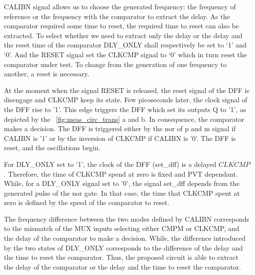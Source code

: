 CALIBN signal allows us to choose the generated frequency: the frequency of reference or the frequency with the comparator to extract the delay. As the comparator required some time to reset, the required time to reset can also be extracted. To select whether we need to extract only the delay or the delay and the reset time of the comparator DLY\_ONLY shall respectively be set to `1' and `0'. And the RESET signal set the CLKCMP signal to `0' which in turn reset the comparator under test. To change from the generation of one frequency to another, a reset is necessary.

At the moment when the signal RESET is released, the reset signal of the DFF is disengage and CLKCMP keep its state. Few picoseconds later, the clock signal of the DFF rise to '1'. This edge triggers the DFF which set its outputs Q to '1', as depicted by the \figurename~\ref{fig:meas_circ_trans} a and b. In consequence, the comparator makes a decision. The DFF is triggered either by the nor of p and m signal if CALIBN is '1' or by the inversion of CLKCMP if CALIBN is '0'. The DFF is reset, and the oscillations begin.

For DLY\_ONLY set to '1', the clock of the DFF (set\_dff) is a delayed \(\overline{CLKCMP}\). Therefore, the time of CLKCMP spend at zero is fixed and PVT dependant. While, for a DLY\_ONLY signal set to '0', the signal set\_dff depends from the generated pulse of the nor gate. In that case, the time that CLKCMP spent at zero is defined by the speed of the comparator to reset.

The frequency difference between the two modes defined by CALIBN corresponds to the mismatch of the MUX inputs selecting either CMPM or CLKCMP, and the delay of the comparator to make a decision. While, the difference introduced by the two states of DLY\_ONLY corresponds to the difference of the delay and the time to reset the comparator. Thus, the proposed circuit is able to extract the delay of the comparator or the delay and the time to reset the comparator.

